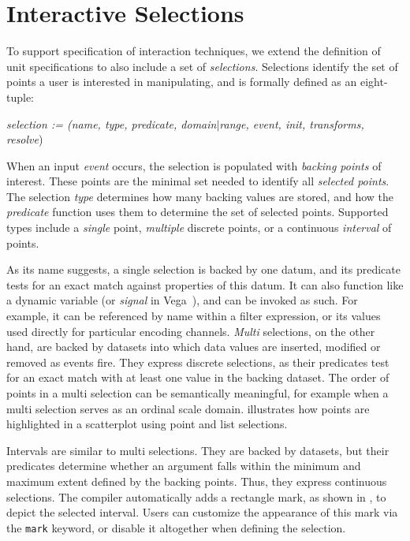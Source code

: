 \section{Interactive Selections}
\label{sec:vlgoi}

To support specification of interaction techniques, we extend the definition of
unit specifications to also include a set of \emph{selections}. Selections
identify the set of points a user is interested in manipulating, and is formally
defined as an eight-tuple:

\centerline{
  \emph{selection := (name, type, predicate, domain$|$range, event, init,
  transforms, resolve})
}

When an input \emph{event} occurs, the selection is populated with \emph{backing
points} of interest. These points are the minimal set needed to identify all
\emph{selected points}. The selection \emph{type} determines how many backing
values are stored, and how the \emph{predicate} function uses them to determine
the set of selected points. Supported types include a \emph{single} point,
\emph{multiple} discrete points, or a continuous \emph{interval} of points.

As its name suggests, a single selection is backed by one datum, and its
predicate tests for an exact match against properties of this datum. It can also
function like a dynamic variable (or \emph{signal} in
Vega~\cite{reactive-vega-model}), and can be invoked as such. For example, it
can be referenced by name within a filter expression, or its values used
directly for particular encoding channels. \emph{Multi} selections, on the other
hand, are backed by datasets into which data values are inserted, modified or
removed as events fire. They express discrete selections, as their predicates
test for an exact match with at least one value in the backing dataset. The
order of points in a multi selection can be semantically meaningful, for example
when a multi selection serves as an ordinal scale domain.
 illustrates how points are highlighted in a scatterplot
using point and list selections.

Intervals are similar to multi selections. They are backed by datasets, but
their predicates determine whether an argument falls within the minimum and
maximum extent defined by the backing points. Thus, they express continuous
selections. The compiler automatically adds a rectangle mark, as shown in
, to depict the selected interval. Users can
customize the appearance of this mark via the \texttt{mark} keyword, or disable
it altogether when defining the selection.

